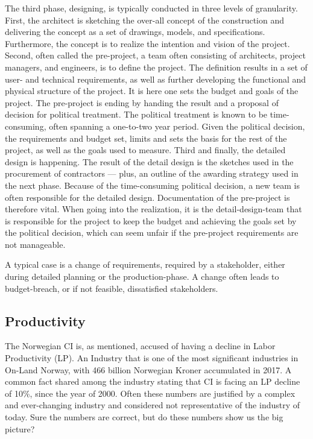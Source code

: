 The third phase, designing, is typically conducted in three levels of granularity. First, the architect is sketching the over-all concept of the construction and delivering the concept as a set of drawings, models, and specifications. Furthermore, the concept is to realize the intention and vision of the project. Second, often called the pre-project, a team often consisting of architects, project managers, and engineers, is to define the project. The definition results in a set of user- and technical requirements, as well as further developing the functional and physical structure of the project. It is here one sets the budget and goals of the project. The pre-project is ending by handing the result and a proposal of decision for political treatment. The political treatment is known to be time-consuming, often spanning a one-to-two year period. Given the political decision, the requirements and budget set, limits and sets the basis for the rest of the project, as well as the goals used to measure. Third and finally, the detailed design is happening. The result of the detail design is the sketches used in the procurement of contractors — plus, an outline of the awarding strategy used in the next phase. Because of the time-consuming political decision, a new team is often responsible for the detailed design. Documentation of the pre-project is therefore vital. When going into the realization, it is the detail-design-team that is responsible for the project to keep the budget and achieving the goals set by the political decision, which can seem unfair if the pre-project requirements are not manageable.

A typical case is a change of requirements, required by a stakeholder, either during detailed planning or the production-phase. A change often leads to budget-breach, or if not feasible, dissatisfied stakeholders. 

\subsection{Productivity}
The Norwegian CI is, as mentioned, accused of having a decline in Labor Productivity (LP). An Industry that is one of the most significant industries in On-Land Norway, with 466 billion Norwegian Kroner accumulated in 2017. A common fact shared among the industry stating that CI is facing an LP decline of 10\%, since the year of 2000. Often these numbers are justified by a complex and ever-changing industry and considered not representative of the industry of today. Sure the numbers are correct, but do these numbers show us the big picture?

